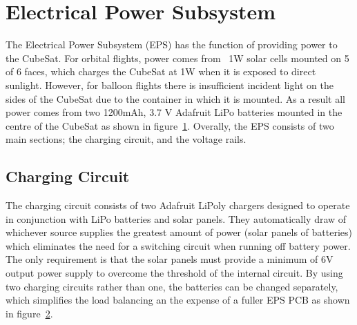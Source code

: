 \section{Electrical Power Subsystem}

The Electrical Power Subsystem (EPS) has the function of providing power to the CubeSat.  For orbital flights, power comes from ~1W solar cells mounted on 5 of 6 faces, which charges the CubeSat at 1W when it is exposed to direct sunlight.  However, for balloon flights there is insufficient incident light on the sides of the CubeSat due to the container in which it is mounted.  As a result all power comes from two 1200mAh, 3.7 V Adafruit LiPo batteries mounted in the centre of the CubeSat as shown in figure~\ref{fig:epsloc}.
Overally, the EPS consists of two main sections; the charging circuit, and the voltage rails.

\begin{figure}[H]
	\label{fig:epsloc}
\end{figure} 

\subsection{Charging Circuit}
The charging circuit consists of two Adafruit LiPoly chargers designed to operate in conjunction with LiPo batteries and solar panels.  They automatically draw of whichever source supplies the greatest amount of power (solar panels of batteries) which eliminates the need for a switching circuit when running off battery power.  The only requirement is that the solar panels must provide a minimum of 6V output power supply to overcome the threshold of the internal circuit.  By using two charging circuits rather than one, the batteries can be changed separately, which simplifies the load balancing an the expense of a fuller EPS PCB as shown in figure~\ref{fig:epspcb}.

\begin{figure}[H]
	\label{fig:epspcb}
\end{figure}

